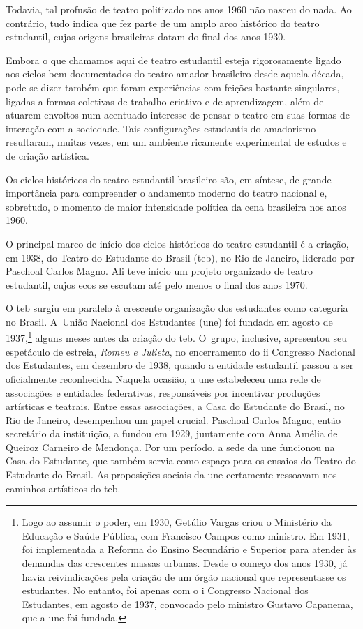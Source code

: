 Todavia, tal profusão de teatro politizado nos anos 1960 não nasceu do
nada. Ao contrário, tudo indica que fez parte de um amplo arco
histórico do teatro estudantil, cujas origens brasileiras datam do final dos anos
1930.

Embora o que chamamos aqui de teatro estudantil esteja rigorosamente
ligado aos ciclos bem documentados do teatro amador brasileiro desde
aquela década, pode-se dizer também que foram experiências com feições
bastante singulares, ligadas a formas coletivas de trabalho criativo e
de aprendizagem, além de atuarem envoltos num acentuado interesse de
pensar o teatro em suas formas de interação com a sociedade. Tais
configurações estudantis do amadorismo resultaram, muitas vezes, em um
ambiente ricamente experimental de estudos e de criação artística.

Os ciclos históricos do teatro estudantil brasileiro são, em síntese,
de grande importância para compreender o andamento moderno do teatro
nacional e, sobretudo, o momento de maior intensidade política da cena
brasileira nos anos 1960.

\subject{Pedra angular: Teatro do Estudante do Brasil}

O principal marco de início dos ciclos históricos do teatro estudantil é
a criação, em 1938, do Teatro do Estudante do Brasil ({\sc teb}), no Rio de Janeiro,
liderado por Paschoal Carlos Magno. Ali teve início um projeto
organizado de teatro estudantil, cujos ecos se escutam até pelo menos o
final dos anos 1970.

O {\sc teb} surgiu em paralelo à crescente organização dos estudantes como
categoria no Brasil. A~União Nacional dos Estudantes ({\sc une}) foi fundada em
agosto de 1937,\footnote{Logo ao assumir o poder, em 1930, Getúlio Vargas
  criou o Ministério da Educação e Saúde Pública, com Francisco Campos
  como ministro. Em 1931, foi implementada a Reforma do Ensino
  Secundário e Superior para atender às demandas das crescentes massas
  urbanas. Desde o começo dos anos 1930, já havia reivindicações pela
  criação de um órgão nacional que representasse os estudantes. No
  entanto, foi apenas com o {\sc i} Congresso Nacional dos Estudantes, em
  agosto de 1937, convocado pelo ministro Gustavo Capanema, que a {\sc une}
  foi fundada.} alguns meses antes da criação do {\sc teb}. O~grupo,
inclusive, apresentou seu espetáculo de estreia, {\it Romeu e Julieta},
no encerramento do {\sc ii} Congresso Nacional dos Estudantes, em dezembro de
1938, quando a entidade estudantil passou a ser oficialmente reconhecida.
Naquela ocasião, a {\sc une} estabeleceu uma rede de associações e entidades
federativas, responsáveis por incentivar produções artísticas e
teatrais. Entre essas associações, a Casa do Estudante do Brasil, no Rio
de Janeiro, desempenhou um papel crucial. Paschoal Carlos Magno, então
secretário da instituição, a fundou em 1929, juntamente com Anna Amélia
de Queiroz Carneiro de Mendonça. Por um período, a sede da {\sc une} funcionou
na Casa do Estudante, que também servia como espaço para os ensaios do
Teatro do Estudante do Brasil. As proposições sociais da {\sc une}
certamente ressoavam nos caminhos artísticos do {\sc teb}.

